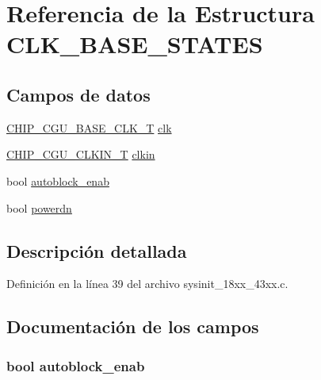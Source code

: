 \hypertarget{struct_c_l_k___b_a_s_e___s_t_a_t_e_s}{}\section{Referencia de la Estructura C\+L\+K\+\_\+\+B\+A\+S\+E\+\_\+\+S\+T\+A\+T\+ES}
\label{struct_c_l_k___b_a_s_e___s_t_a_t_e_s}
\subsection*{Campos de datos}
\begin{DoxyCompactItemize}
\item 
\hyperlink{chip__clocks_8h_a31e266dd83cc66eb866d8d051ffd1d45}{C\+H\+I\+P\+\_\+\+C\+G\+U\+\_\+\+B\+A\+S\+E\+\_\+\+C\+L\+K\+\_\+T} \hyperlink{struct_c_l_k___b_a_s_e___s_t_a_t_e_s_a45ff188655e503500c8d6a397ae42746}{clk}
\item 
\hyperlink{group___c_l_o_c_k__18_x_x__43_x_x_ga0975326707efebf2b074283e6c602f18}{C\+H\+I\+P\+\_\+\+C\+G\+U\+\_\+\+C\+L\+K\+I\+N\+\_\+T} \hyperlink{struct_c_l_k___b_a_s_e___s_t_a_t_e_s_a7bfb394ec7a201b4effc72376f929521}{clkin}
\item 
bool \hyperlink{struct_c_l_k___b_a_s_e___s_t_a_t_e_s_af93f1c57740f804278a48f6520825a73}{autoblock\+\_\+enab}
\item 
bool \hyperlink{struct_c_l_k___b_a_s_e___s_t_a_t_e_s_a7389c48dd958a2fc6e480ede1cc535b7}{powerdn}
\end{DoxyCompactItemize}


\subsection{Descripción detallada}


Definición en la línea 39 del archivo sysinit\+\_\+18xx\+\_\+43xx.\+c.



\subsection{Documentación de los campos}
\subsubsection[{\texorpdfstring{autoblock\+\_\+enab}{autoblock_enab}}]{\setlength{\rightskip}{0pt plus 5cm}bool autoblock\+\_\+enab}\hypertarget{struct_c_l_k___b_a_s_e___s_t_a_t_e_s_af93f1c57740f804278a48f6520825a73}{}\label{struct_c_l_k___b_a_s_e___s_t_a_t_e_s_af93f1c57740f804278a48f6520825a73}


